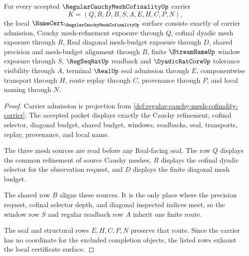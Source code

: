 \begin{theorem}
\label{thm:regular-cauchy-mesh-cofinality-namecert-obligations}
For every accepted $\RegularCauchyMeshCofinalityUp$ carrier
$$
K=(Q,R,D,B,S,A,E,H,C,P,N),
$$
the local $\NameCert_{\RegularCauchyMeshCofinalityUp}$ surface consists exactly of carrier admission, Cauchy mesh-refinement exposure through $Q$, cofinal dyadic mesh exposure through $R$, Real diagonal mesh-budget exposure through $D$, shared precision and mesh-budget alignment through $B$, finite $\StreamNameUp$ window exposure through $S$, $\RegSeqRatUp$ readback and $\DyadicRatCoreUp$ tolerance visibility through $A$, terminal $\RealUp$ seal admission through $E$, componentwise transport through $H$, route replay through $C$, provenance through $P$, and local naming through $N$.
\end{theorem}
\begin{proof}
Carrier admission is projection from \autoref{def:regular-cauchy-mesh-cofinality-carrier}. The accepted packet displays exactly the Cauchy refinement, cofinal selector, diagonal budget, shared budget, windows, readbacks, seal, transports, replay, provenance, and local name.

The three mesh sources are read before any Real-facing seal. The row $Q$ displays the common refinement of source Cauchy meshes, $R$ displays the cofinal dyadic selector for the observation request, and $D$ displays the finite diagonal mesh budget.

The shared row $B$ aligns these sources. It is the only place where the precision request, cofinal selector depth, and diagonal inspected indices meet, so the window row $S$ and regular readback row $A$ inherit one finite route.

The seal and structural rows $E,H,C,P,N$ preserve that route. Since the carrier has no coordinate for the excluded completion objects, the listed rows exhaust the local certificate surface.
\end{proof}

